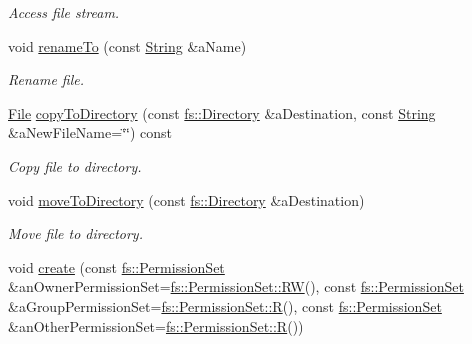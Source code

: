 \begin{DoxyCompactItemize}
\begin{DoxyCompactList}\small\item\em Access file stream. \end{DoxyCompactList}\item 
void \mbox{\hyperlink{classlibrary_1_1core_1_1fs_1_1_file_ae65190a612b6958e9e36238e3370c134}{rename\+To}} (const \mbox{\hyperlink{classlibrary_1_1core_1_1types_1_1_string}{String}} \&a\+Name)
\begin{DoxyCompactList}\small\item\em Rename file. \end{DoxyCompactList}\item 
\mbox{\hyperlink{classlibrary_1_1core_1_1fs_1_1_file}{File}} \mbox{\hyperlink{classlibrary_1_1core_1_1fs_1_1_file_a9fd8a0cca72e2414f071d6045c0a1a0d}{copy\+To\+Directory}} (const \mbox{\hyperlink{classlibrary_1_1core_1_1fs_1_1_directory}{fs\+::\+Directory}} \&a\+Destination, const \mbox{\hyperlink{classlibrary_1_1core_1_1types_1_1_string}{String}} \&a\+New\+File\+Name=\char`\"{}\char`\"{}) const
\begin{DoxyCompactList}\small\item\em Copy file to directory. \end{DoxyCompactList}\item 
void \mbox{\hyperlink{classlibrary_1_1core_1_1fs_1_1_file_ac81efdfeb17ea50abe23d96f69bc15ae}{move\+To\+Directory}} (const \mbox{\hyperlink{classlibrary_1_1core_1_1fs_1_1_directory}{fs\+::\+Directory}} \&a\+Destination)
\begin{DoxyCompactList}\small\item\em Move file to directory. \end{DoxyCompactList}\item 
void \mbox{\hyperlink{classlibrary_1_1core_1_1fs_1_1_file_aa0219ae27a3706a1bf9d9afcc7d91830}{create}} (const \mbox{\hyperlink{classlibrary_1_1core_1_1fs_1_1_permission_set}{fs\+::\+Permission\+Set}} \&an\+Owner\+Permission\+Set=\mbox{\hyperlink{classlibrary_1_1core_1_1fs_1_1_permission_set_aed46e87c4c521dd37d7f276d8ca87955}{fs\+::\+Permission\+Set\+::\+RW}}(), const \mbox{\hyperlink{classlibrary_1_1core_1_1fs_1_1_permission_set}{fs\+::\+Permission\+Set}} \&a\+Group\+Permission\+Set=\mbox{\hyperlink{classlibrary_1_1core_1_1fs_1_1_permission_set_a3e14cd99abd197736da0ab7880b1fbec}{fs\+::\+Permission\+Set\+::R}}(), const \mbox{\hyperlink{classlibrary_1_1core_1_1fs_1_1_permission_set}{fs\+::\+Permission\+Set}} \&an\+Other\+Permission\+Set=\mbox{\hyperlink{classlibrary_1_1core_1_1fs_1_1_permission_set_a3e14cd99abd197736da0ab7880b1fbec}{fs\+::\+Permission\+Set\+::R}}())

\end{DoxyCompactItemize}

